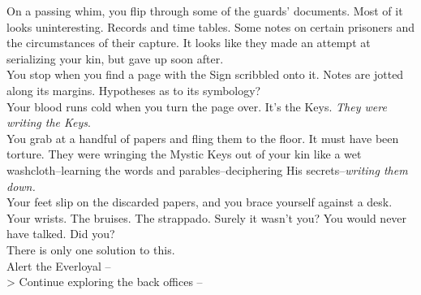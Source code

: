 On a passing whim, you flip through some of the guards’ documents. Most of it looks uninteresting. Records and time tables. Some notes on certain prisoners and the circumstances of their capture. It looks like they made an attempt at serializing your kin, but gave up soon after.\\

You stop when you find a page with the Sign scribbled onto it. Notes are jotted along its margins. Hypotheses as to its symbology?\\

Your blood runs cold when you turn the page over. It’s the Keys. \emph{They were writing the Keys}.\\

You grab at a handful of papers and fling them to the floor. It must have been torture. They were wringing the Mystic Keys out of your kin like a wet washcloth--learning the words and parables--deciphering His secrets--\emph{writing them down.}\\

Your feet slip on the discarded papers, and you brace yourself against a desk. Your wrists. The bruises. The strappado. Surely it wasn’t you? You would never have talked. Did you?\\

There is only one solution to this.\\

 Alert the Everloyal --  \\
> Continue exploring the back offices -- 